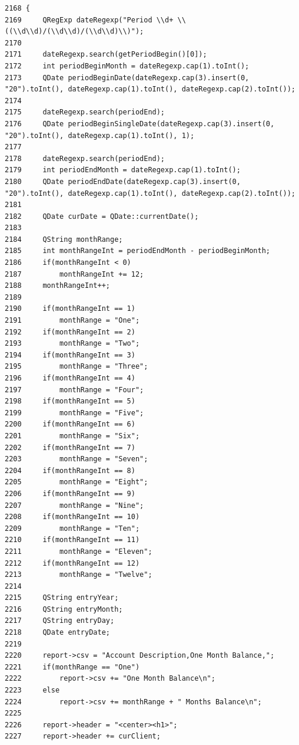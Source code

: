 \footnotesize\begin{verbatim}2168 {
2169     QRegExp dateRegexp("Period \\d+ \\((\\d\\d)/(\\d\\d)/(\\d\\d)\\)");
2170 
2171     dateRegexp.search(getPeriodBegin()[0]);
2172     int periodBeginMonth = dateRegexp.cap(1).toInt();
2173     QDate periodBeginDate(dateRegexp.cap(3).insert(0, "20").toInt(), dateRegexp.cap(1).toInt(), dateRegexp.cap(2).toInt());
2174 
2175     dateRegexp.search(periodEnd);
2176     QDate periodBeginSingleDate(dateRegexp.cap(3).insert(0, "20").toInt(), dateRegexp.cap(1).toInt(), 1);
2177 
2178     dateRegexp.search(periodEnd);
2179     int periodEndMonth = dateRegexp.cap(1).toInt();
2180     QDate periodEndDate(dateRegexp.cap(3).insert(0, "20").toInt(), dateRegexp.cap(1).toInt(), dateRegexp.cap(2).toInt());
2181 
2182     QDate curDate = QDate::currentDate();
2183 
2184     QString monthRange;
2185     int monthRangeInt = periodEndMonth - periodBeginMonth;
2186     if(monthRangeInt < 0)
2187         monthRangeInt += 12;
2188     monthRangeInt++;
2189 
2190     if(monthRangeInt == 1)
2191         monthRange = "One";
2192     if(monthRangeInt == 2)
2193         monthRange = "Two";
2194     if(monthRangeInt == 3)
2195         monthRange = "Three";
2196     if(monthRangeInt == 4)
2197         monthRange = "Four";
2198     if(monthRangeInt == 5)
2199         monthRange = "Five";
2200     if(monthRangeInt == 6)
2201         monthRange = "Six";
2202     if(monthRangeInt == 7)
2203         monthRange = "Seven";
2204     if(monthRangeInt == 8)
2205         monthRange = "Eight";
2206     if(monthRangeInt == 9)
2207         monthRange = "Nine";
2208     if(monthRangeInt == 10)
2209         monthRange = "Ten";
2210     if(monthRangeInt == 11)
2211         monthRange = "Eleven";
2212     if(monthRangeInt == 12)
2213         monthRange = "Twelve";
2214 
2215     QString entryYear;
2216     QString entryMonth;
2217     QString entryDay;
2218     QDate entryDate;
2219 
2220     report->csv = "Account Description,One Month Balance,";
2221     if(monthRange == "One")
2222         report->csv += "One Month Balance\n";
2223     else
2224         report->csv += monthRange + " Months Balance\n";
2225 
2226     report->header = "<center><h1>";
2227     report->header += curClient;

\end{verbatim}

